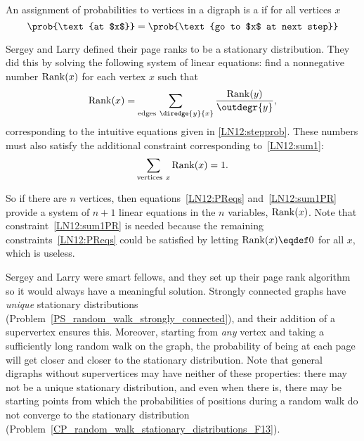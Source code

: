 \begin{definition} An assignment of probabilities to vertices in a digraph
  is a  if for all vertices $x$
\[
\prob{\text{at $x$}} = \prob{\text{go to $x$ at next step}}
\]
\end{definition}  

Sergey and Larry defined their page ranks to be a stationary distribution.
They did this by solving the following system of linear equations: find a
nonnegative number $\operatorname{Rank}(x)$ for each vertex $x$ such that
\begin{equation}\label{LN12:PReqs}
\PRnk(x) = \sum_{\text{edges}\ \diredge{y}{x}} \frac{\PRnk(y)}{\outdegr{y}},
\end{equation}
corresponding to the intuitive equations given in \eqref{LN12:stepprob}.
These numbers must also satisfy the additional constraint corresponding
to~\eqref{LN12:sum1}:
\begin{equation}\label{LN12:sum1PR}
\sum_{\text{vertices}\ x} \operatorname{Rank}(x) = 1.
\end{equation}

So if there are $n$ vertices, then equations~\eqref{LN12:PReqs}
and~\eqref{LN12:sum1PR} provide a system of $n+1$ linear equations in the
$n$ variables, $\operatorname{Rank}(x)$.  Note that constraint~\eqref{LN12:sum1PR}
is needed because the remaining constraints~\eqref{LN12:PReqs} could be
satisfied by letting $\PRnk(x)\eqdef 0$ for all $x$, which is useless.

Sergey and Larry were smart fellows, and they set up their page rank
algorithm so it would always have a meaningful solution.  Strongly
connected graphs have \emph{unique} stationary distributions
(Problem~\ref{PS_random_walk_strongly_connected}), and their addition
of a supervertex ensures this.  Moreover, starting from \emph{any}
vertex and taking a sufficiently long random walk on the graph, the
probability of being at each page will get closer and closer to the
stationary distribution.  Note that general digraphs without
supervertices may have neither of these properties: there may not be a
unique stationary distribution, and even when there is, there may be
starting points from which the probabilities of positions during a
random walk do not converge to the stationary distribution
(Problem~\ref{CP_random_walk_stationary_distributions_F13}).

